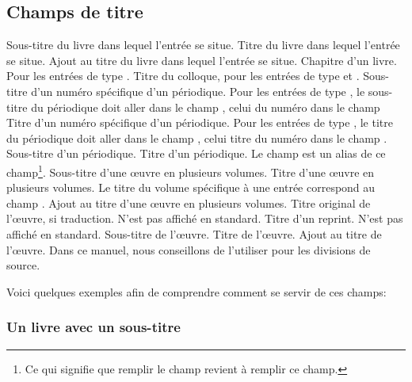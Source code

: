 \subsection{Champs de titre}


\begin{fieldlist}
	Sous-titre du livre dans lequel l'entrée se situe. 
   	 Titre du livre dans lequel l'entrée se situe. 		
   	 Ajout au titre du livre dans lequel l'entrée se situe. 
   	 Chapitre d'un livre. Pour les entrées de type .	
   	 Titre du colloque, pour les entrées de type  et .
   	 Sous-titre d'un numéro spécifique d'un périodique. 	Pour les entrées de type , le sous-titre du périodique doit aller dans le champ , celui du numéro dans le champ 		
   	 Titre d'un numéro spécifique d'un périodique. Pour les entrées de type , le titre du périodique doit aller dans le champ , celui titre du numéro dans le champ .		
   	 Sous-titre d'un périodique.							
   	 Titre d'un périodique. Le champ  est un alias de ce champ\footnote{Ce qui signifie que remplir le champ  revient à remplir ce champ.}.				
   	 Sous-titre d'une œuvre en plusieurs volumes.			
   	 Titre d'une œuvre en plusieurs volumes. Le titre du volume spécifique à une entrée correspond au champ .						
   	  Ajout au titre d'une œuvre en plusieurs volumes.		
   	 Titre original de l'œuvre, si traduction. N'est pas affiché en standard. 
   	 Titre d'un reprint. N'est pas affiché en standard.	
   	 Sous-titre de l'œuvre.									
   	 Titre de l'œuvre.									
   	 Ajout au titre de l'œuvre. Dans ce manuel, nous conseillons de l'utiliser pour les divisions de source. 
\end{fieldlist}

Voici quelques exemples afin de comprendre comment se servir de ces champs:

\subsubsection{Un livre avec un sous-titre}


